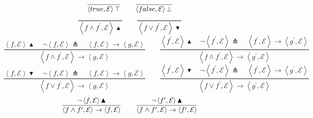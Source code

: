 \begin{equation*}
\frac{{}}{\left\langle true,\mathcal{E}\right\rangle \top }\qquad \frac{{}}{%
\left\langle false,\mathcal{E}\right\rangle \bot }
\end{equation*}%
\begin{equation*}
\frac{{}}{\left\langle f\wedge f^{\prime },\mathcal{E}\right\rangle
\blacktriangle }\qquad \frac{{}}{\left\langle f\vee f^{\prime },\mathcal{E}%
\right\rangle \blacktriangledown }
\end{equation*}%
\begin{equation*}
\frac{\left\langle f,\mathcal{E}\right\rangle \blacktriangle \quad \lnot
\left\langle f,\mathcal{E}\right\rangle \pitchfork \quad \left\langle f,%
\mathcal{E}\right\rangle \rightarrow \left\langle g,\mathcal{E}\right\rangle 
}{\left\langle f\wedge f^{\prime },\mathcal{E}\right\rangle \rightarrow
\left\langle g,\mathcal{E}\right\rangle }\qquad \frac{\left\langle f^{\prime
},\mathcal{E}\right\rangle \blacktriangle \quad \lnot \left\langle f^{\prime
},\mathcal{E}\right\rangle \pitchfork \quad \left\langle f^{\prime },%
\mathcal{E}\right\rangle \rightarrow \left\langle g^{\prime },\mathcal{E}%
\right\rangle }{\left\langle f\wedge f^{\prime },\mathcal{E}\right\rangle
\rightarrow \left\langle g^{\prime },\mathcal{E}\right\rangle }
\end{equation*}%
\begin{equation*}
\frac{\left\langle f,\mathcal{E}\right\rangle \blacktriangledown \quad \lnot
\left\langle f,\mathcal{E}\right\rangle \pitchfork \quad \left\langle f,%
\mathcal{E}\right\rangle \rightarrow \left\langle g,\mathcal{E}\right\rangle 
}{\left\langle f\vee f^{\prime },\mathcal{E}\right\rangle \rightarrow
\left\langle g,\mathcal{E}\right\rangle }\qquad \frac{\left\langle f^{\prime
},\mathcal{E}\right\rangle \blacktriangledown \quad \lnot \left\langle
f^{\prime },\mathcal{E}\right\rangle \pitchfork \quad \left\langle f^{\prime
},\mathcal{E}\right\rangle \rightarrow \left\langle g^{\prime },\mathcal{E}%
\right\rangle }{\left\langle f\vee f^{\prime },\mathcal{E}\right\rangle
\rightarrow \left\langle g^{\prime },\mathcal{E}\right\rangle }
\end{equation*}%
\begin{equation*}
\frac{\lnot \left\langle f,\mathcal{E}\right\rangle \blacktriangle }{%
\left\langle f\wedge f^{\prime },\mathcal{E}\right\rangle \rightarrow
\left\langle f,\mathcal{E}\right\rangle }\qquad \frac{\lnot \left\langle
f^{\prime },\mathcal{E}\right\rangle \blacktriangle }{\left\langle f\wedge
f^{\prime },\mathcal{E}\right\rangle \rightarrow \left\langle f^{\prime },%
\mathcal{E}\right\rangle }
\end{equation*}%
